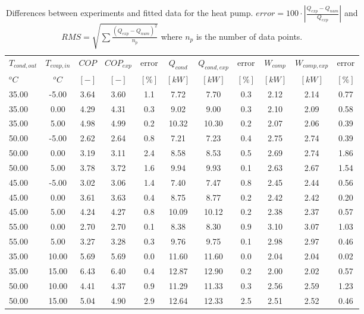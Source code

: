 \documentclass[english]{SPFShortReport}
\begin{document}
\begin{table}[!ht]
\begin{small}
\caption{Differences between experiments and fitted data for the heat pump.          $error=100 \cdot |\frac{Q_{exp}-Q_{num}}{Q_{exp}}|$ and $RMS = \sqrt { \sum{\frac{(Q_{exp}-Q_{num})^2}{n_p}} }$ where $n_p$ is the number of data points.}
\begin{center}
\resizebox{12cm}{!} 
{
\begin{tabular}{l | c c c c c c c c c c } 
\hline
\hline
$T_{cond,out}$ &$T_{evap,in}$ &$COP$ &$COP_{exp}$ &error &$Q_{cond}$ &$Q_{cond,exp}$ &error &$W_{comp}$ &$W_{comp,exp}$ &error \\ 
$^oC$ &$^oC$ &$[-]$ &$[-]$ &$[\%]$ &$[kW]$ &$[kW]$ &$[\%]$ &$[kW]$ &$[kW]$ &$[\%]$\\ 
\hline
35.00  & -5.00 & 3.64 & 3.60 & 1.1 & 7.72 & 7.70 & 0.3 & 2.12 & 2.14 & 0.77\\ 
35.00  & 0.00 & 4.29 & 4.31 & 0.3 & 9.02 & 9.00 & 0.3 & 2.10 & 2.09 & 0.58\\ 
35.00  & 5.00 & 4.98 & 4.99 & 0.2 & 10.32 & 10.30 & 0.2 & 2.07 & 2.06 & 0.39\\ 
50.00  & -5.00 & 2.62 & 2.64 & 0.8 & 7.21 & 7.23 & 0.4 & 2.75 & 2.74 & 0.39\\ 
50.00  & 0.00 & 3.19 & 3.11 & 2.4 & 8.58 & 8.53 & 0.5 & 2.69 & 2.74 & 1.86\\ 
50.00  & 5.00 & 3.78 & 3.72 & 1.6 & 9.94 & 9.93 & 0.1 & 2.63 & 2.67 & 1.54\\ 
45.00  & -5.00 & 3.02 & 3.06 & 1.4 & 7.40 & 7.47 & 0.8 & 2.45 & 2.44 & 0.56\\ 
45.00  & 0.00 & 3.61 & 3.63 & 0.4 & 8.75 & 8.77 & 0.2 & 2.42 & 2.42 & 0.20\\ 
45.00  & 5.00 & 4.24 & 4.27 & 0.8 & 10.09 & 10.12 & 0.2 & 2.38 & 2.37 & 0.57\\ 
55.00  & 0.00 & 2.70 & 2.70 & 0.1 & 8.38 & 8.30 & 0.9 & 3.10 & 3.07 & 1.03\\ 
55.00  & 5.00 & 3.27 & 3.28 & 0.3 & 9.76 & 9.75 & 0.1 & 2.98 & 2.97 & 0.46\\ 
35.00  & 10.00 & 5.69 & 5.69 & 0.0 & 11.60 & 11.60 & 0.0 & 2.04 & 2.04 & 0.02\\ 
35.00  & 15.00 & 6.43 & 6.40 & 0.4 & 12.87 & 12.90 & 0.2 & 2.00 & 2.02 & 0.57\\ 
50.00  & 10.00 & 4.41 & 4.37 & 0.9 & 11.29 & 11.33 & 0.3 & 2.56 & 2.59 & 1.23\\ 
50.00  & 15.00 & 5.04 & 4.90 & 2.9 & 12.64 & 12.33 & 2.5 & 2.51 & 2.52 & 0.46\\ 

\end{tabular}}
\end{center}
\end{small}
\end{table}
\end{document}
